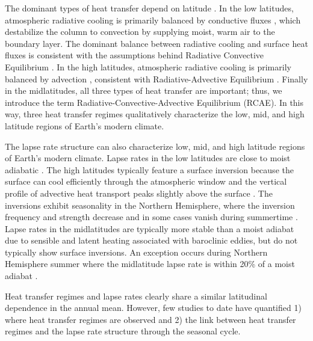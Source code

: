 \documentclass{ametsocV5}
\begin{document}
The dominant types of heat transfer depend on latitude \citep[e.g., see Fig.~6.1 in][]{hartmann2016}. In the low latitudes, atmospheric radiative cooling is primarily balanced by conductive fluxes \citep{riehl1958}, which destabilize the column to convection by supplying moist, warm air to the boundary layer. The dominant balance between radiative cooling and surface heat fluxes is consistent with the assumptions behind Radiative Convective Equilibrium \citep[RCE,][]{wing2018}. In the high latitudes, atmospheric radiative cooling is primarily balanced by advection \citep{nakamura1988}, consistent with Radiative-Advective Equilibrium \citep[RAE,][]{cronin2016}. Finally in the midlatitudes, all three types of heat transfer are important; thus, we introduce the term Radiative-Convective-Advective Equilibrium (RCAE). In this way, three heat transfer regimes qualitatively characterize the low, mid, and high latitude regions of Earth's modern climate.

The lapse rate structure can also characterize low, mid, and high latitude regions of Earth's modern climate. Lapse rates in the low latitudes are close to moist adiabatic \citep{stone1979,betts1982,xu1989,williams1993}. The high latitudes typically feature a surface inversion \citep[e.g., see Fig.~1.3 in][]{hartmann2016} because the surface can cool efficiently through the atmospheric window \citep{cronin2016} and the vertical profile of advective heat transport peaks slightly above the surface \citep{oort1974, overland1994, hahn2020, cardinale2021}. The inversions exhibit seasonality in the Northern Hemisphere, where the inversion frequency and strength decrease \citep{bradley1992, tjernstrom2009, devasthale2010, zhang2011, cronin2016} and in some cases vanish during summertime \citep{stone1979}. Lapse rates in the midlatitudes are typically more stable than a moist adiabat \citep{stone1979,korty2007} due to sensible and latent heating associated with baroclinic eddies, but do not typically show surface inversions. An exception occurs during Northern Hemisphere summer where the midlatitude lapse rate is within 20\% of a moist adiabat \citep{stone1979}.

Heat transfer regimes and lapse rates clearly share a similar latitudinal dependence in the annual mean. However, few studies to date have quantified 1) where heat transfer regimes are observed and 2) the link between heat transfer regimes and the lapse rate structure through the seasonal cycle.

\end{document}
